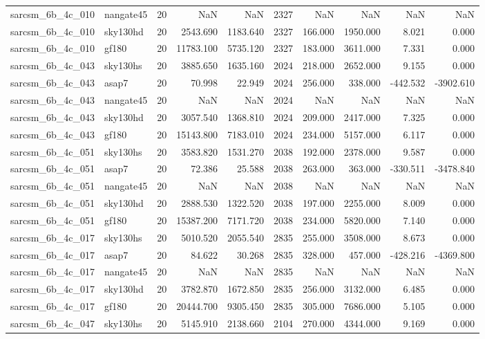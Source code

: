 \documentclass{article}
\begin{document}
\begin{longtable}{llrrrrrrrr}
sarcsm\_6b\_4c\_010 & nangate45 & 20 & NaN & NaN & 2327 & NaN & NaN & NaN & NaN \\
sarcsm\_6b\_4c\_010 & sky130hd & 20 & 2543.690 & 1183.640 & 2327 & 166.000 & 1950.000 & 8.021 & 0.000 \\
sarcsm\_6b\_4c\_010 & gf180 & 20 & 11783.100 & 5735.120 & 2327 & 183.000 & 3611.000 & 7.331 & 0.000 \\
sarcsm\_6b\_4c\_043 & sky130hs & 20 & 3885.650 & 1635.160 & 2024 & 218.000 & 2652.000 & 9.155 & 0.000 \\
sarcsm\_6b\_4c\_043 & asap7 & 20 & 70.998 & 22.949 & 2024 & 256.000 & 338.000 & -442.532 & -3902.610 \\
sarcsm\_6b\_4c\_043 & nangate45 & 20 & NaN & NaN & 2024 & NaN & NaN & NaN & NaN \\
sarcsm\_6b\_4c\_043 & sky130hd & 20 & 3057.540 & 1368.810 & 2024 & 209.000 & 2417.000 & 7.325 & 0.000 \\
sarcsm\_6b\_4c\_043 & gf180 & 20 & 15143.800 & 7183.010 & 2024 & 234.000 & 5157.000 & 6.117 & 0.000 \\
sarcsm\_6b\_4c\_051 & sky130hs & 20 & 3583.820 & 1531.270 & 2038 & 192.000 & 2378.000 & 9.587 & 0.000 \\
sarcsm\_6b\_4c\_051 & asap7 & 20 & 72.386 & 25.588 & 2038 & 263.000 & 363.000 & -330.511 & -3478.840 \\
sarcsm\_6b\_4c\_051 & nangate45 & 20 & NaN & NaN & 2038 & NaN & NaN & NaN & NaN \\
sarcsm\_6b\_4c\_051 & sky130hd & 20 & 2888.530 & 1322.520 & 2038 & 197.000 & 2255.000 & 8.009 & 0.000 \\
sarcsm\_6b\_4c\_051 & gf180 & 20 & 15387.200 & 7171.720 & 2038 & 234.000 & 5820.000 & 7.140 & 0.000 \\
sarcsm\_6b\_4c\_017 & sky130hs & 20 & 5010.520 & 2055.540 & 2835 & 255.000 & 3508.000 & 8.673 & 0.000 \\
sarcsm\_6b\_4c\_017 & asap7 & 20 & 84.622 & 30.268 & 2835 & 328.000 & 457.000 & -428.216 & -4369.800 \\
sarcsm\_6b\_4c\_017 & nangate45 & 20 & NaN & NaN & 2835 & NaN & NaN & NaN & NaN \\
sarcsm\_6b\_4c\_017 & sky130hd & 20 & 3782.870 & 1672.850 & 2835 & 256.000 & 3132.000 & 6.485 & 0.000 \\
sarcsm\_6b\_4c\_017 & gf180 & 20 & 20444.700 & 9305.450 & 2835 & 305.000 & 7686.000 & 5.105 & 0.000 \\
sarcsm\_6b\_4c\_047 & sky130hs & 20 & 5145.910 & 2138.660 & 2104 & 270.000 & 4344.000 & 9.169 & 0.000 \\

\end{longtable}
\end{document}
